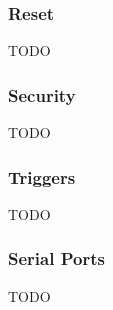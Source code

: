 \subsubsection{Reset}

TODO

\subsubsection{Security}

TODO

\subsubsection{Triggers}

TODO

\subsubsection{Serial Ports}

TODO

